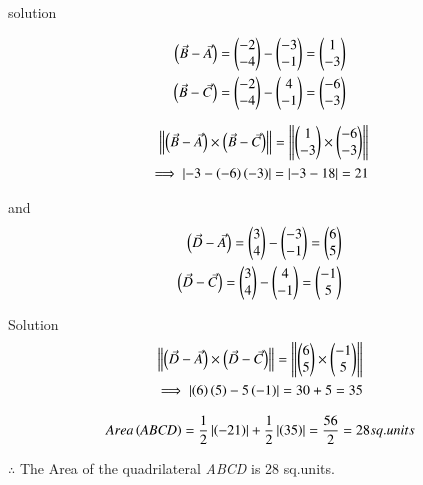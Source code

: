 \documentclass{beamer}
\begin{document}
\begin{frame}{solution}

  \begin{align}
 \left(\Vec{B}-\Vec{A}\right)=\begin{pmatrix}-2\\-4\end{pmatrix}-\begin{pmatrix}-3\\-1\end{pmatrix}=\begin{pmatrix}1\\-3\end{pmatrix}\\ 
  \left(\Vec{B}-\Vec{C}\right)=\begin{pmatrix}-2\\-4\end{pmatrix}-\begin{pmatrix}4\\-1\end{pmatrix}=\begin{pmatrix}-6\\-3\end{pmatrix}
 \end{align}
 
\begin{align}
 \left\|\left(\Vec{B}-\Vec{A}\right) \times \left(\Vec{B}-\Vec{C}\right)\right\|=\left\| \begin{pmatrix}1\\-3\end{pmatrix}\times \begin{pmatrix}-6\\-3\end{pmatrix}\right\|\\ \implies\left|-3-\left(-6\right)\left(-3\right)\right|=\left|-3-18\right|=21
\end{align}

 and\begin{align}
      \left(\Vec{D}-\Vec{A}\right)=\begin{pmatrix}3\\4\end{pmatrix}-\begin{pmatrix}-3\\-1\end{pmatrix}=\begin{pmatrix}6\\5\end{pmatrix}\\
       \left(\Vec{D}-\Vec{C}\right)=\begin{pmatrix}3\\4\end{pmatrix}-\begin{pmatrix}4\\-1\end{pmatrix}=\begin{pmatrix}-1\\5\end{pmatrix}
 \end{align}

\end{frame}
\begin{frame}{Solution}
 \begin{align}
\left\|\left(\Vec{D}-\Vec{A}\right) \times \left(\Vec{D}-\Vec{C}\right)\right\|=\left\|\begin{pmatrix}6\\5\end{pmatrix} \times \begin{pmatrix}-1\\5\end{pmatrix} \right\|\\ \implies\left|\left(6\right)\left(5\right)-5\left(-1\right)\right|=30+5=35
\end{align}

\begin{align}
    Area \left(\textit{ABCD}\right)=\frac{1}{2} \left|\left(-21\right)\right|+\frac{1}{2}\left|\left(35\right)\right|=\frac{56}{2}=28 sq.units
\end{align}
\begin{center}
$\therefore$ The Area of the quadrilateral \textit{ABCD} is 28 sq.units.
\end{center}
 \end{frame}
\end{document}
